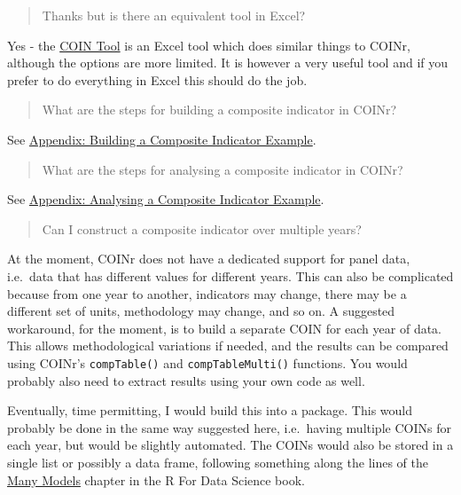\documentclass[
]{book}
\begin{document}
\begin{quote}
Thanks but is there an equivalent tool in Excel?
\end{quote}

Yes - the \href{https://knowledge4policy.ec.europa.eu/composite-indicators/coin-tool_en}{COIN Tool} is an Excel tool which does similar things to COINr, although the options are more limited. It is however a very useful tool and if you prefer to do everything in Excel this should do the job.

\begin{quote}
What are the steps for building a composite indicator in COINr?
\end{quote}

See \protect\hyperlink{appendix-building-a-composite-indicator-example}{Appendix: Building a Composite Indicator Example}.

\begin{quote}
What are the steps for analysing a composite indicator in COINr?
\end{quote}

See \protect\hyperlink{appendix-analysing-a-composite-indicator-example}{Appendix: Analysing a Composite Indicator Example}.

\begin{quote}
Can I construct a composite indicator over multiple years?
\end{quote}

At the moment, COINr does not have a dedicated support for panel data, i.e.~data that has different values for different years. This can also be complicated because from one year to another, indicators may change, there may be a different set of units, methodology may change, and so on. A suggested workaround, for the moment, is to build a separate COIN for each year of data. This allows methodological variations if needed, and the results can be compared using COINr's \texttt{compTable()} and \texttt{compTableMulti()} functions. You would probably also need to extract results using your own code as well.

Eventually, time permitting, I would build this into a package. This would probably be done in the same way suggested here, i.e.~having multiple COINs for each year, but would be slightly automated. The COINs would also be stored in a single list or possibly a data frame, following something along the lines of the \href{https://r4ds.had.co.nz/many-models.html}{Many Models} chapter in the R For Data Science book.
\end{document}
